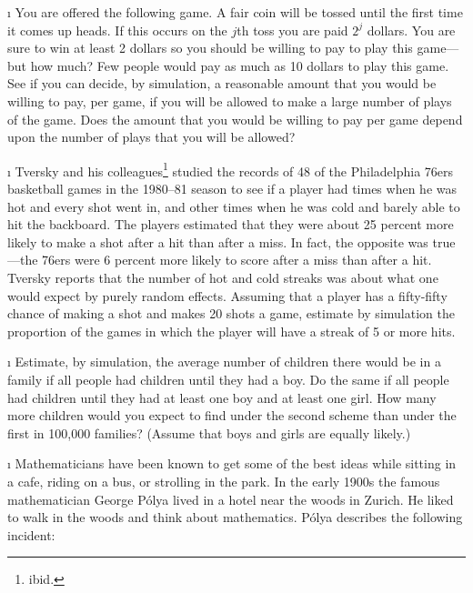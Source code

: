 \begin{LJSItem}
\i\label{exer 1.1.14} You are offered the following game.  A fair coin will be
tossed until the
first time it comes up heads.  If this occurs on the $j$th toss you are paid
$2^j$ dollars.  You are sure to win at least 2 dollars so you should be
willing
to pay to play this game---but how much?  Few people would pay as much as 10
dollars to play this game.  See if you can decide, by simulation, a
reasonable
amount that you would be willing to pay, per game, if you will be allowed
to make a large number of plays of the game.
Does the amount that you would be willing to pay per game depend upon the
number of plays that you will be allowed?

\i\label{exer 1.1.15} Tversky and his colleagues\footnote{ibid.} studied
the records of 48
of the Philadelphia 76ers basketball games in 
the 1980--81 season to see if a player
had times when he was hot and every shot went in, and other times when he was
cold and barely able to hit the backboard.  The players estimated that they
were about 25 percent more likely to make a shot after a hit than after a
miss.  In fact, the opposite was true---the 76ers were 6 percent more likely
to
score after a miss than after a hit.  Tversky reports that the number of hot
and cold streaks was about what one would expect by purely random effects. 
Assuming that a player has a fifty-fifty chance of making a shot and makes 20
shots a game, estimate by simulation the proportion of the games in which the
player will have a streak of 5 or more hits.

\i\label{1.1.16} Estimate, by simulation, the average number of children
there would 
be in a family if all people had children until they had a boy.  Do the same
if all
people had children until they had at least one boy and at least one girl. 
How
many more children would you expect to find under the second scheme than
under the first in 100{,}000 families?  (Assume that boys and girls are
equally
likely.)


\i\label{exer 1.1.17} Mathematicians have been known to get some of the
best ideas while
sitting in a cafe, riding on a bus, or strolling in the park.  In the early
1900s the famous mathematician George P\'olya lived in a hotel near the 
woods in Zurich.  He liked to walk in the woods and think about mathematics.  
P\'olya describes the following incident:


\end{LJSItem}
